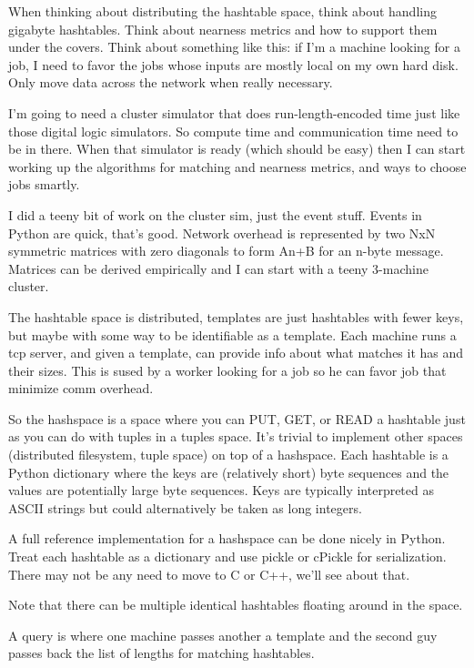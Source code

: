 \documentclass[11pt]{article}
\begin{document}
When thinking about distributing the hashtable space, think about
handling gigabyte hashtables. Think about nearness metrics and how to
support them under the covers. Think about something like this: if I'm
a machine looking for a job, I need to favor the jobs whose inputs are
mostly local on my own hard disk. Only move data across the network
when really necessary.

I'm going to need a cluster simulator that does run-length-encoded
time just like those digital logic simulators. So compute time and
communication time need to be in there. When that simulator is ready
(which should be easy) then I can start working up the algorithms for
matching and nearness metrics, and ways to choose jobs smartly.

I did a teeny bit of work on the cluster sim, just the event stuff.
Events in Python are quick, that's good. Network overhead is
represented by two NxN symmetric matrices with zero diagonals to form
An+B for an n-byte message. Matrices can be derived empirically and I
can start with a teeny 3-machine cluster.

The hashtable space is distributed, templates are just hashtables with
fewer keys, but maybe with some way to be identifiable as a template.
Each machine runs a tcp server, and given a template, can provide info
about what matches it has and their sizes. This is sused by a worker
looking for a job so he can favor job that minimize comm overhead.

So the hashspace is a space where you can PUT, GET, or READ a
hashtable just as you can do with tuples in a tuples space. It's
trivial to implement other spaces (distributed filesystem, tuple
space) on top of a hashspace. Each hashtable is a Python dictionary
where the keys are (relatively short) byte sequences and the values
are potentially large byte sequences. Keys are typically interpreted
as ASCII strings but could alternatively be taken as long integers.
 
A full reference implementation for a hashspace can be done nicely in
Python. Treat each hashtable as a dictionary and use pickle or cPickle
for serialization. There may not be any need to move to C or C++,
we'll see about that.
 
Note that there can be multiple identical hashtables floating around
in the space.
 
A query is where one machine passes another a template and the second
guy passes back the list of lengths for matching hashtables.
 
\end{document}
